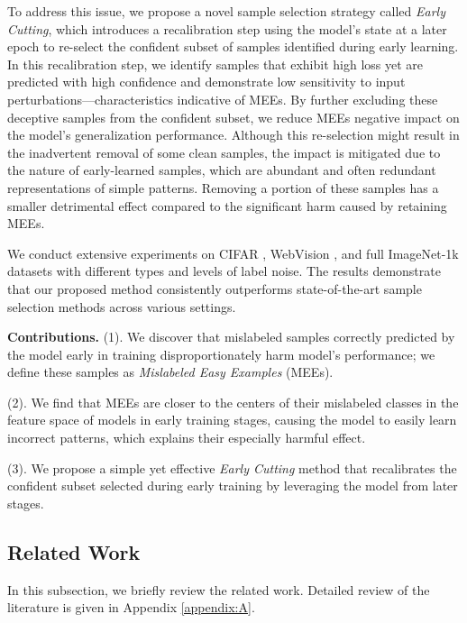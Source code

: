 To address this issue, we propose a novel sample selection strategy called \emph{Early Cutting}, which introduces a recalibration step using the model's state at a later epoch to re-select the confident subset of samples identified during early learning. In this recalibration step, we identify samples that exhibit high loss yet are predicted with high confidence and demonstrate low sensitivity to input perturbations—characteristics indicative of MEEs. By further excluding these deceptive samples from the confident subset, we reduce MEEs negative impact on the model's generalization performance. Although this re-selection might result in the inadvertent removal of some clean samples, the impact is mitigated due to the nature of early-learned samples, which are abundant and often redundant representations of simple patterns. Removing a portion of these samples has a smaller detrimental effect compared to the significant harm caused by retaining MEEs.

We conduct extensive experiments on CIFAR \cite{krizhevsky2009learning}, WebVision \cite{li2017webvision}, and full ImageNet-1k \cite{deng2009imagenet} datasets with different types and levels of label noise. The results demonstrate that our proposed method consistently outperforms state-of-the-art sample selection methods across various settings. 


\textbf{Contributions.}
(1). We discover that mislabeled samples correctly predicted by the model early in training disproportionately harm model's performance; we define these samples as \emph{Mislabeled Easy Examples} (MEEs).

(2). We find that MEEs are closer to the centers of their mislabeled classes in the feature space of models in early training stages, causing the model to easily learn incorrect patterns, which explains their especially harmful effect.

(3). We propose a simple yet effective \emph{Early Cutting} method that recalibrates the confident subset selected during early training by leveraging the model from later stages.



\subsection{Related Work}
In this subsection, we briefly review the related work. Detailed review of the literature is given in Appendix \ref{appendix:A}.

